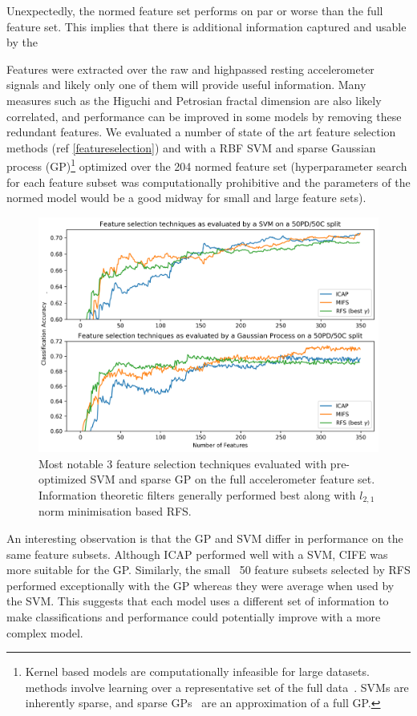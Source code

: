\documentclass[12pt, twoside]{book}
\renewcommand\emph[1]{\textit{\color{USred}{#1}}}
\begin{document}
Unexpectedly, the normed feature set performs on par or worse than the full feature set. This implies that there is additional information captured and usable by the 


Features were extracted over the raw and highpassed resting accelerometer signals and likely only one of them will provide useful information. Many measures such as the Higuchi and Petrosian fractal dimension are also likely correlated, and performance can be improved in some models by removing these redundant features. We evaluated a number of state of the art feature selection methods (ref \ref{featureselection}) and with a RBF SVM and sparse Gaussian process (GP)\footnote{Kernel based models are computationally infeasible for large datasets. \emph{Sparse} methods involve learning over a representative set of the full data~\cite{sparsematrix}. SVMs are inherently sparse, and sparse GPs~\cite{sparsegp} are an approximation of a full GP.} optimized over the 204 normed feature set (hyperparameter search for each feature subset was computationally prohibitive and the parameters of the normed model would be a good midway for small and large feature sets).


\begin{figure}[h]
	\label{accelerometerfsel}
	\centering\centerline{\includegraphics[width=1.07\linewidth]{fsel_accel.png}}
	\caption{Most notable 3 feature selection techniques evaluated with pre-optimized SVM and sparse GP on the full accelerometer feature set. Information theoretic filters generally performed best along with $l_{2,1}$ norm minimisation based RFS.}
\end{figure}

An interesting observation is that the GP and SVM differ in performance on the same feature subsets. Although ICAP performed well with a SVM, CIFE was more suitable for the GP. Similarly, the small ~50 feature subsets selected by RFS performed exceptionally with the GP whereas they were average when used by the SVM. This suggests that each model uses a different set of information to make classifications and performance could potentially improve with a more complex model. 
\end{document}
